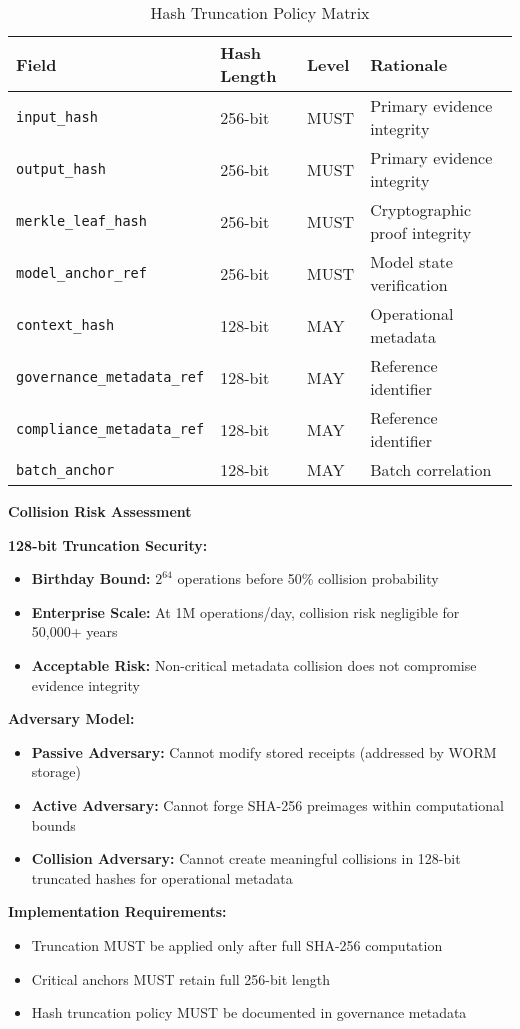 \documentclass[12pt,a4paper]{article}
\begin{document}
\begin{table}[H]
\centering
\begin{tabular}{p{5cm}p{2.5cm}p{2.5cm}p{4.25cm}}
\toprule
\textbf{Field} & \textbf{Hash Length} & \textbf{Level} & \textbf{Rationale} \\
\midrule
\texttt{input\_hash} & 256-bit & MUST & Primary evidence integrity \\
\texttt{output\_hash} & 256-bit & MUST & Primary evidence integrity \\
\texttt{merkle\_leaf\_hash} & 256-bit & MUST & Cryptographic proof integrity \\
\texttt{model\_anchor\_ref} & 256-bit & MUST & Model state verification \\
\midrule
\texttt{context\_hash} & 128-bit & MAY & Operational metadata \\
\texttt{governance\_metadata\_ref} & 128-bit & MAY & Reference identifier \\
\texttt{compliance\_metadata\_ref} & 128-bit & MAY & Reference identifier \\
\texttt{batch\_anchor} & 128-bit & MAY & Batch correlation \\
\bottomrule
\end{tabular}
\caption{Hash Truncation Policy Matrix}
\label{tab:hash_truncation}
\end{table}

\begin{technicalbox}
\textbf{Collision Risk Assessment}

\textbf{128-bit Truncation Security:}
\begin{itemize}
\item \textbf{Birthday Bound:} $2^{64}$ operations before 50\% collision probability
\item \textbf{Enterprise Scale:} At 1M operations/day, collision risk negligible for 50,000+ years
\item \textbf{Acceptable Risk:} Non-critical metadata collision does not compromise evidence integrity
\end{itemize}

\textbf{Adversary Model:}
\begin{itemize}
\item \textbf{Passive Adversary:} Cannot modify stored receipts (addressed by WORM storage)
\item \textbf{Active Adversary:} Cannot forge SHA-256 preimages within computational bounds
\item \textbf{Collision Adversary:} Cannot create meaningful collisions in 128-bit truncated hashes for operational metadata
\end{itemize}

\textbf{Implementation Requirements:}
\begin{itemize}
\item Truncation MUST be applied only after full SHA-256 computation
\item Critical anchors MUST retain full 256-bit length
\item Hash truncation policy MUST be documented in governance metadata
\end{itemize}
\end{technicalbox}
\end{document}
